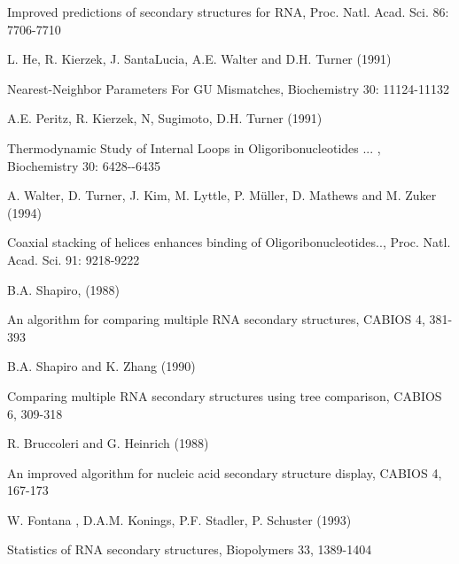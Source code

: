 \begin{DoxyEnumerate}
\begin{DoxyEnumerate}
\begin{DoxyEnumerate}
\begin{DoxyEnumerate}
\begin{DoxyEnumerate}
\begin{DoxyEnumerate}
 Improved predictions of secondary structures for RNA, Proc. Natl. Acad. Sci. 86: 7706-\/7710
\begin{DoxyEnumerate}
\item \label{mp__ref_he_91}
\hypertarget{mp__ref_he_91}{}
 L. He, R. Kierzek, J. SantaLucia, A.E. Walter and D.H. Turner (1991)\par
 Nearest-\/Neighbor Parameters For GU Mismatches, Biochemistry 30: 11124-\/11132
\begin{DoxyEnumerate}
\item \label{mp__ref_peritz_91}
\hypertarget{mp__ref_peritz_91}{}
 A.E. Peritz, R. Kierzek, N, Sugimoto, D.H. Turner (1991)\par
 Thermodynamic Study of Internal Loops in Oligoribonucleotides ... , Biochemistry 30: 6428-\/-\/6435
\begin{DoxyEnumerate}
\item \label{mp__ref_walter_94}
\hypertarget{mp__ref_walter_94}{}
 A. Walter, D. Turner, J. Kim, M. Lyttle, P. M\"{u}ller, D. Mathews and M. Zuker (1994)\par
 Coaxial stacking of helices enhances binding of Oligoribonucleotides.., Proc. Natl. Acad. Sci. 91: 9218-\/9222
\begin{DoxyEnumerate}
\item \label{mp__ref_shapiro_88}
\hypertarget{mp__ref_shapiro_88}{}
 B.A. Shapiro, (1988)\par
 An algorithm for comparing multiple RNA secondary structures, CABIOS 4, 381-\/393
\begin{DoxyEnumerate}
\item \label{mp__ref_shapiro_90}
\hypertarget{mp__ref_shapiro_90}{}
 B.A. Shapiro and K. Zhang (1990)\par
 Comparing multiple RNA secondary structures using tree comparison, CABIOS 6, 309-\/318
\begin{DoxyEnumerate}
\item \label{mp__ref_bruccoleri_88}
\hypertarget{mp__ref_bruccoleri_88}{}
 R. Bruccoleri and G. Heinrich (1988)\par
 An improved algorithm for nucleic acid secondary structure display, CABIOS 4, 167-\/173
\begin{DoxyEnumerate}
\item \label{mp__ref_fontana_93a}
\hypertarget{mp__ref_fontana_93a}{}
 W. Fontana , D.A.M. Konings, P.F. Stadler, P. Schuster (1993) \par
 Statistics of RNA secondary structures, Biopolymers 33, 1389-\/1404
\begin{DoxyEnumerate}

\end{DoxyEnumerate}
\end{DoxyEnumerate}
\end{DoxyEnumerate}
\end{DoxyEnumerate}
\end{DoxyEnumerate}
\end{DoxyEnumerate}
\end{DoxyEnumerate}
\end{DoxyEnumerate}
\end{DoxyEnumerate}
\end{DoxyEnumerate}
\end{DoxyEnumerate}
\end{DoxyEnumerate}
\end{DoxyEnumerate}
\end{DoxyEnumerate}
